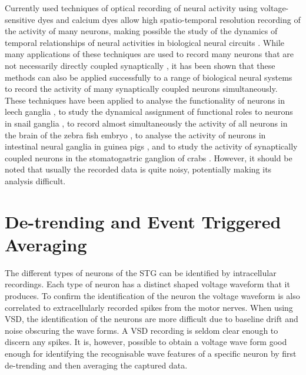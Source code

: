 Currently used techniques of optical recording of neural activity using voltage-sensitive dyes and calcium dyes allow high spatio-temporal resolution recording of the activity of many neurons, making possible the study of the dynamics of temporal relationships of neural activities in biological neural circuits \cite{Canepari2010}. While many applications of these techniques are used to record many neurons that are not necessarily directly coupled synaptically \cite{Mukamel2009, Rothschild2010}, it has been shown that these methods can also be applied successfully to a range of biological neural systems to record the activity of many synaptically coupled neurons simultaneously. These techniques have been applied to analyse the functionality of neurons in leech ganglia \cite{Briggman2010}, to study the dynamical assignment of functional roles to neurons in snail ganglia \cite{Hill2012, Bruno2015}, to record almost simultaneously the activity of all neurons in the brain of the zebra fish embryo \cite{Ahrens2012}, to analyse the activity of neurons in intestinal neural ganglia in guinea pigs \cite{Obaid1999}, and to study the activity of synaptically coupled neurons in the stomatogastric ganglion of crabs \cite{Stein2011, Staedele2012}.  However, it should be noted that usually the recorded data is quite noisy, potentially making its analysis difficult.
	
	
\section{De-trending and Event Triggered Averaging}
\label{sec:detrend}
The different types of neurons of the \ac{STG} can be identified by intracellular recordings. Each type of neuron has a distinct shaped voltage waveform that it produces. To confirm the identification of the neuron the voltage waveform is also correlated to extracellularly recorded spikes from the motor nerves. When using \ac{VSD}, the identification of the neurons are more difficult due to baseline drift and noise obscuring the wave forms.  A \ac{VSD} recording is seldom clear enough to discern any spikes. It is, however, possible to obtain a voltage wave form good enough for identifying the recognisable wave features of a specific neuron by first de-trending and then averaging the captured data.

